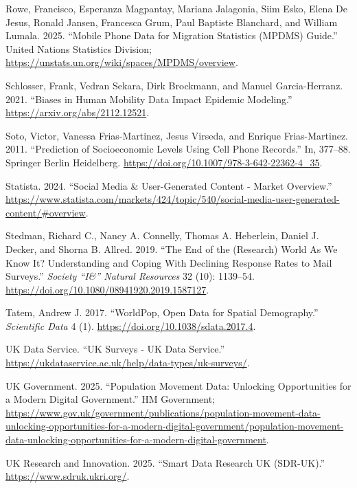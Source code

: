\documentclass{article}
\newlength{\cslhangindent}
\newenvironment{CSLReferences}[2] %
 {\begin{list}{}{%
  \setlength{\itemindent}{0pt}
  \setlength{\leftmargin}{0pt}
  \setlength{\parsep}{0pt}
  \ifodd #1
   \setlength{\leftmargin}{\cslhangindent}
   \setlength{\itemindent}{-1\cslhangindent}
  \fi
  \setlength{\itemsep}{#2\baselineskip}}}
 {\end{list}}
\begin{document}
\begin{CSLReferences}{1}{0}
Rowe, Francisco, Esperanza Magpantay, Mariana Jalagonia, Siim Esko, Elena De Jesus, Ronald Jansen, Francesca Grum, Paul Baptiste Blanchard, and William Lumala. 2025. {``Mobile Phone Data for Migration Statistics (MPDMS) Guide.''} United Nations Statistics Division; \url{https://unstats.un.org/wiki/spaces/MPDMS/overview}.

Schlosser, Frank, Vedran Sekara, Dirk Brockmann, and Manuel Garcia-Herranz. 2021. {``Biases in Human Mobility Data Impact Epidemic Modeling.''} \url{https://arxiv.org/abs/2112.12521}.

Soto, Victor, Vanessa Frias-Martinez, Jesus Virseda, and Enrique Frias-Martinez. 2011. {``Prediction of Socioeconomic Levels Using Cell Phone Records.''} In, 377--88. Springer Berlin Heidelberg. \url{https://doi.org/10.1007/978-3-642-22362-4_35}.

Statista. 2024. {``Social Media \& User-Generated Content - Market Overview.''} \url{https://www.statista.com/markets/424/topic/540/social-media-user-generated-content/\#overview}.

Stedman, Richard C., Nancy A. Connelly, Thomas A. Heberlein, Daniel J. Decker, and Shorna B. Allred. 2019. {``The End of the (Research) World As We Know It? Understanding and Coping With Declining Response Rates to Mail Surveys.''} \emph{Society {``I\&''} Natural Resources} 32 (10): 1139--54. \url{https://doi.org/10.1080/08941920.2019.1587127}.

Tatem, Andrew J. 2017. {``WorldPop, Open Data for Spatial Demography.''} \emph{Scientific Data} 4 (1). \url{https://doi.org/10.1038/sdata.2017.4}.

UK Data Service. {``{U}{K} Surveys - {U}{K} {D}ata {S}ervice.''} \url{https://ukdataservice.ac.uk/help/data-types/uk-surveys/}.

UK Government. 2025. {``Population Movement Data: Unlocking Opportunities for a Modern Digital Government.''} HM Government; \url{https://www.gov.uk/government/publications/population-movement-data-unlocking-opportunities-for-a-modern-digital-government/population-movement-data-unlocking-opportunities-for-a-modern-digital-government}.

UK Research and Innovation. 2025. {``Smart Data Research UK (SDR-UK).''} \url{https://www.sdruk.ukri.org/}.


\end{CSLReferences}
\end{document}
